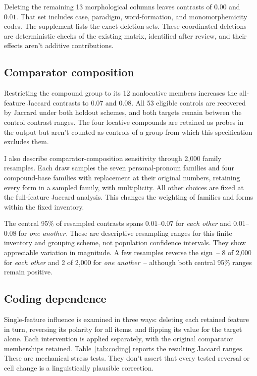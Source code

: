 \documentclass[12pt]{article}
\providecommand{\mention}[1]{\textit{#1}}
\begin{document}
Deleting the remaining 13 morphological columns leaves contrasts of $0.00$ and $0.01$. That set includes case, paradigm, word-formation, and monomorphemicity codes. The supplement lists the exact deletion sets. These coordinated deletions are deterministic checks of the existing matrix, identified after review, and their effects aren't additive contributions.

\subsection{Comparator composition}

Restricting the compound group to its 12 nonlocative members increases the all-feature Jaccard contrasts to $0.07$ and $0.08$. All 53 eligible controls are recovered by Jaccard under both holdout schemes, and both targets remain between the control contrast ranges. The four locative compounds are retained as probes in the output but aren't counted as controls of a group from which this specification excludes them.

I also describe comparator-composition sensitivity through 2,000 family resamples. Each draw samples the seven personal-pronoun families and four compound-base families with replacement at their original numbers, retaining every form in a sampled family, with multiplicity. All other choices are fixed at the full-feature Jaccard analysis. This changes the weighting of families and forms within the fixed inventory.

The central 95\% of resampled contrasts spans $0.01$--$0.07$ for \mention{each other} and $0.01$--$0.08$ for \mention{one another}. These are descriptive resampling ranges for this finite inventory and grouping scheme, not population confidence intervals. They show appreciable variation in magnitude. A few resamples reverse the sign~-- 8 of 2,000 for \mention{each other} and 2 of 2,000 for \mention{one another}~-- although both central 95\% ranges remain positive.

\subsection{Coding dependence}
\label{sec:coding}

Single-feature influence is examined in three ways: deleting each retained feature in turn, reversing its polarity for all items, and flipping its value for the target alone. Each intervention is applied separately, with the original comparator memberships retained. Table~\ref{tab:coding} reports the resulting Jaccard ranges. These are mechanical stress tests. They don't assert that every tested reversal or cell change is a linguistically plausible correction.
\end{document}
